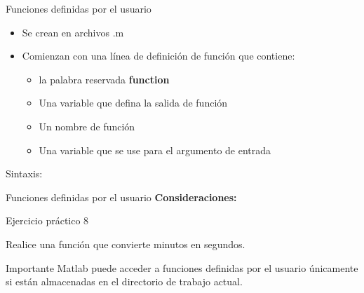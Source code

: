 \documentclass{bredelebeamer}
\begin{document}
\begin{frame}{Funciones definidas por el usuario}
\begin{itemize}
\item Se crean en archivos .m
\item Comienzan con una línea de definición de función que contiene:
\begin{itemize}
\item la palabra reservada \textbf{function}
\item Una variable que defina la salida de función
\item Un nombre de función
\item Una variable que se use para el argumento de entrada
\end{itemize}
\end{itemize}
Sintaxis:

\end{frame}

\begin{frame}{Funciones definidas por el usuario}
\textbf{Consideraciones:}
\end{frame}

\begin{frame}{Ejercicio práctico 8}
\begin{center}
Realice una función que convierte minutos en segundos.
\end{center}
\begin{alertblock}{Importante}
Matlab puede acceder a funciones definidas por el usuario únicamente si están almacenadas en el directorio de trabajo actual.
\end{alertblock}
\end{frame}
\end{document}
